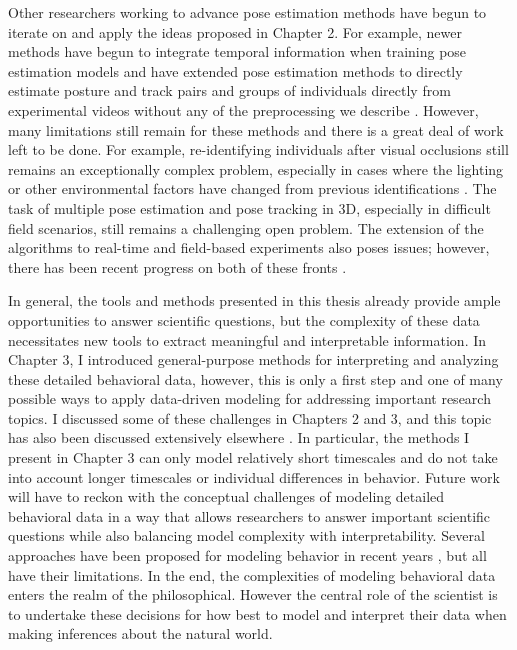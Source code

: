 \documentclass[11pt,a4paper,oneside]{book}
\begin{document}
\begin{doublespace}
Other researchers working to advance pose estimation methods have begun to iterate on and apply the ideas proposed in Chapter 2. For example, newer methods have begun to integrate temporal information when training pose estimation models \citep{liu2020optiflex, wu2020deep} and have extended pose estimation methods to directly estimate posture and track pairs and groups of individuals directly from experimental videos without any of the preprocessing we describe \citep{pereira2020sleap}. However, many limitations still remain for these methods and there is a great deal of work left to be done. For example, re-identifying individuals after visual occlusions still remains an exceptionally complex problem, especially in cases where the lighting or other environmental factors have changed from previous identifications \citep{romero2018idtracker}. The task of multiple pose estimation and pose tracking in 3D, especially in difficult field scenarios, still remains a challenging open problem. The extension of the algorithms to real-time and field-based experiments also poses issues; however, there has been recent progress on both of these fronts \citep{Zuffi:ICCV:2019, kane2020real}.

In general, the tools and methods presented in this thesis already provide ample opportunities to answer scientific questions, but the complexity of these data necessitates new tools to extract meaningful and interpretable information. In Chapter 3, I introduced general-purpose methods for interpreting and analyzing these detailed behavioral data, however, this is only a first step and one of many possible ways to apply data-driven modeling for addressing important research topics. I discussed some of these challenges in Chapters 2 and 3, and this topic has also been discussed extensively elsewhere \citep{brown2018ethology, berman2018measuring, datta2019computational}. In particular, the methods I present in Chapter 3 can only model relatively short timescales and do not take into account longer timescales or individual differences in behavior. Future work will have to reckon with the conceptual challenges of modeling detailed behavioral data in a way that allows researchers to answer important scientific questions while also balancing model complexity with interpretability. Several approaches have been proposed for modeling behavior in recent years \citep{berman2014mapping, berman2016predictability, wiltschko2015mapping, Costa1501, johnson2016composing, markowitz2018striatum}, but all have their limitations. In the end, the complexities of modeling behavioral data enters the realm of the philosophical. However the central role of the scientist is to undertake these decisions for how best to model and interpret their data when making inferences about the natural world.


\end{doublespace}
\end{document}
